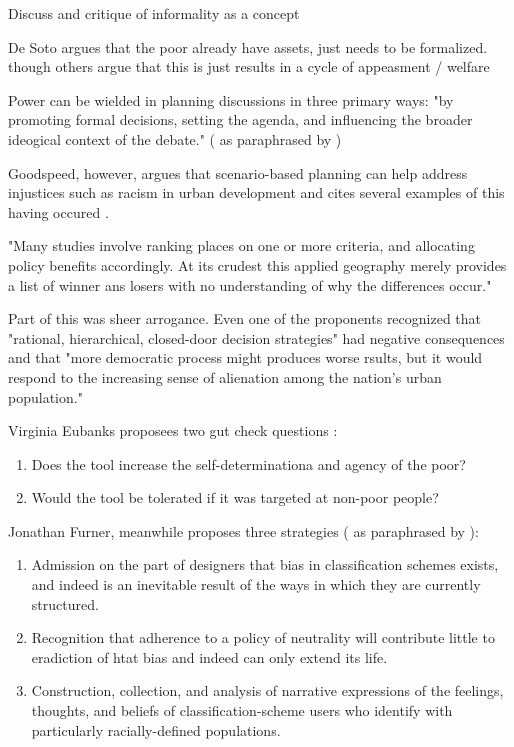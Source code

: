 Discuss and critique of informality as a concept \cite{royUrbanInformalityProduction2016}

De Soto argues that the poor already have assets, just needs to be formalized. \cite{sotoMysteryCapitalWhy2003} though others argue that this is just results in a cycle of appeasment / welfare \cite{hollandForbearanceRedistributionPolitics2017}

Power can be wielded in planning discussions in 
three primary ways: "by promoting formal decisions, setting the agenda, and influencing the broader ideogical context of the debate." (\cite{foresterPlanningFacePower2001} as paraphrased by \cite{goodspeedScenarioPlanningCities2020})

Goodspeed, however, argues that scenario-based planning can help address injustices such as racism in urban development and cites several examples of this having occured \cite{goodspeedScenarioPlanningCities2020}.

"Many studies involve ranking places on one or more criteria, and allocating policy benefits accordingly. At its crudest this applied geography merely provides a list of winner ans losers with no understanding of why the differences occur." \cite{taylorGeographicInformationSystems1994}

Part of this was sheer arrogance. Even one of the proponents recognized that "rational, hierarchical, closed-door decision strategies" had negative consequences and that "more democratic process might produces worse rsults, but it would respond to the increasing sense of alienation among the nation's urban population." \cite{lightWarfareWelfareDefense2005}

Virginia Eubanks proposees two gut check questions \cite{eubanksAutomatingInequalityHow2018}:

\begin{enumerate} \setlength{\itemsep}{0pt} \setlength{\parskip}{0pt} 
	\item{Does the tool increase the self-determinationa and agency of the poor?}
	\item{Would the tool be tolerated if it was targeted at non-poor people?}
\end{enumerate}

Jonathan Furner, meanwhile proposes three strategies (\cite{furner2007dewey} as paraphrased by \cite{nobleAlgorithmsOppressionHow2018}):

\begin{enumerate} \setlength{\itemsep}{0pt} \setlength{\parskip}{0pt} 
	\item{Admission on the part of designers that bias in classification schemes exists, and indeed is an inevitable result of the ways in which they are currently structured.}
	\item{Recognition that adherence to a policy of neutrality will contribute little to eradiction of htat bias and indeed can only extend its life.}
	\item{Construction, collection, and analysis of narrative expressions of the feelings, thoughts, and beliefs of classification-scheme users who identify with particularly racially-defined populations.}
\end{enumerate}



